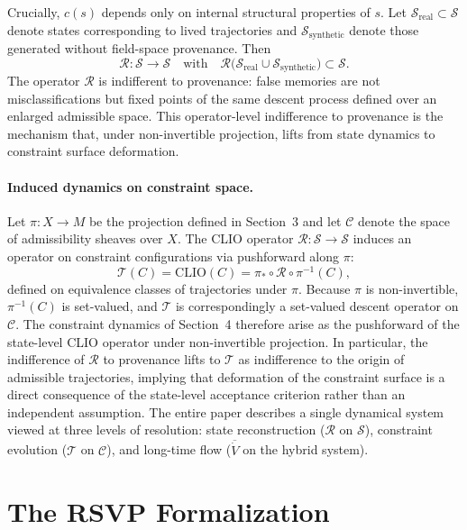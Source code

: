 \documentclass[12pt, a4paper]{article}
\begin{document}
Crucially, $c(s)$ depends only on internal structural properties of $s$. Let $\mathcal{S}_{\mathrm{real}} \subset \mathcal{S}$ denote states corresponding to lived trajectories and $\mathcal{S}_{\mathrm{synthetic}}$ denote those generated without field-space provenance. Then
\[
\mathcal{R} : \mathcal{S} \to \mathcal{S} \quad\text{with}\quad \mathcal{R}\bigl(\mathcal{S}_{\mathrm{real}} \cup \mathcal{S}_{\mathrm{synthetic}}\bigr) \subset \mathcal{S}.
\]
The operator $\mathcal{R}$ is indifferent to provenance: false memories are not misclassifications but fixed points of the same descent process defined over an enlarged admissible space. This operator-level indifference to provenance is the mechanism that, under non-invertible projection, lifts from state dynamics to constraint surface deformation.

\paragraph{Induced dynamics on constraint space.} Let $\pi : X \to M$ be the projection defined in Section~3 and let $\mathcal{C}$ denote the space of admissibility sheaves over $X$. The CLIO operator $\mathcal{R} : \mathcal{S} \to \mathcal{S}$ induces an operator on constraint configurations via pushforward along $\pi$:
\[
\mathcal{T}(C) = \mathrm{CLIO}(C) = \pi_* \circ \mathcal{R} \circ \pi^{-1}(C),
\]
defined on equivalence classes of trajectories under $\pi$. Because $\pi$ is non-invertible, $\pi^{-1}(C)$ is set-valued, and $\mathcal{T}$ is correspondingly a set-valued descent operator on $\mathcal{C}$. The constraint dynamics of Section~4 therefore arise as the pushforward of the state-level CLIO operator under non-invertible projection. In particular, the indifference of $\mathcal{R}$ to provenance lifts to $\mathcal{T}$ as indifference to the origin of admissible trajectories, implying that deformation of the constraint surface is a direct consequence of the state-level acceptance criterion rather than an independent assumption. The entire paper describes a single dynamical system viewed at three levels of resolution: state reconstruction ($\mathcal{R}$ on $\mathcal{S}$), constraint evolution ($\mathcal{T}$ on $\mathcal{C}$), and long-time flow ($\overline{\dot{V}}$ on the hybrid system).

\section{The RSVP Formalization}
\end{document}
